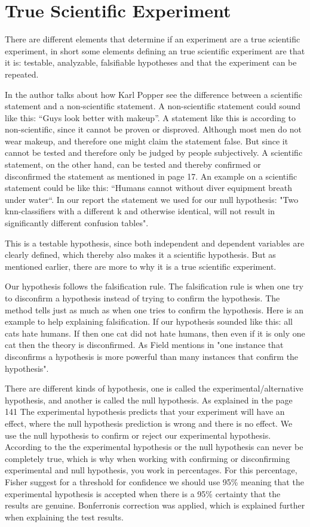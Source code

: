 \section{True Scientific Experiment}
There are different elements that determine if an experiment are a true scientific experiment, in short some elements defining an true scientific experiment are that it is:  testable, analyzable, falsifiable hypotheses and that the experiment can be repeated.

In \citep{Design} the author talks about how Karl Popper see the difference between a scientific statement and a non-scientific statement. A non-scientific statement could sound like this: “Guys look better with makeup”. A statement like this is according to \citep{Design} non-scientific, since it cannot be proven or disproved. Although most men do not wear makeup, and therefore one might claim the statement false. But since it cannot be tested and therefore only be judged by people subjectively. 
A scientific statement, on the other hand, can be tested and thereby confirmed or disconfirmed the statement as mentioned in \citep{Design} page 17. An example on a scientific statement could be like this: “Humans cannot without diver equipment breath under water“.
In our report the statement we used for our null hypothesis: "Two knn-classifiers with a different k and otherwise identical, will not result in significantly different confusion tables". 

This is a testable hypothesis, since both independent and dependent variables are clearly defined, which thereby also makes it a scientific hypothesis. But as mentioned earlier, there are more to why it is a true scientific experiment. 


Our hypothesis follows the falsification rule.
The falsification rule is when one try to disconfirm a hypothesis instead of trying to confirm the hypothesis. The method tells just as much as when one tries to confirm the hypothesis. Here is an example to help explaining  falsification. If our hypothesis sounded like this: all cats hate humans. If then one cat did not hate humans, then even if it is only one cat then the theory is disconfirmed. As Field mentions in \citep{Design} "one instance that disconfirms a hypothesis is more powerful than many instances that confirm the hypothesis".

There are different kinds of hypothesis, one is called the experimental/alternative hypothesis, and another is called the null hypothesis. As explained in the \citep{Design} page 141 The experimental hypothesis predicts that your experiment will have an effect, where the null hypothesis prediction is wrong and there is no effect.
We use the null hypothesis to confirm or reject our experimental hypothesis. According to the \citep{Design} the experimental hypothesis or the null hypothesis can never be completely true, which is why when working with confirming or disconfirming experimental and null hypothesis, you work in percentages. For this percentage, Fisher suggest for a threshold for confidence we should use 95\% meaning that the experimental hypothesis is accepted when there is a 95\% certainty that the results are genuine. Bonferronis correction was applied, which is explained further when explaining the test results. 

